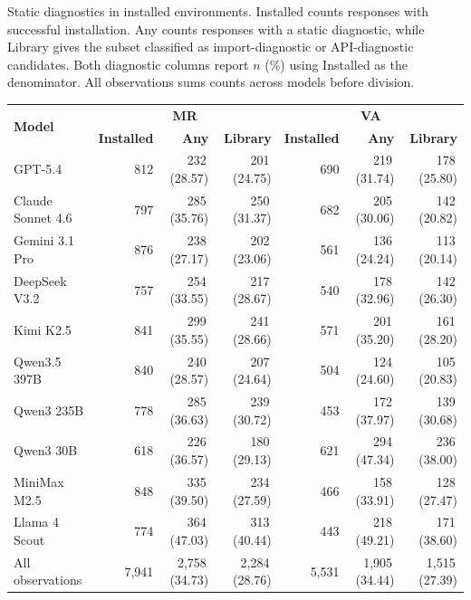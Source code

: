 \begin{tableorg}[!htbp]
\centering\small
\renewcommand{\tablecaptionfont}{\fontsize{9}{11}\selectfont}
\caption{Static diagnostics in installed \myso environments.
Installed counts responses with successful installation.
Any counts responses with a static diagnostic, while Library gives the subset classified as import-diagnostic or API-diagnostic candidates.
Both diagnostic columns report $n$ (\%) using Installed as the denominator.
All observations sums counts across models before division.}
\label{tab:rq3_installed_diagnostics}
\setlength{\tabcolsep}{1pt}
\renewcommand{\arraystretch}{1.12}
\begin{tabular}{@{}lrrr@{\hspace{4pt}}rrr@{}}
\toprule
\multirow{2}{*}{\textbf{Model}} & \multicolumn{3}{c}{\textbf{MR}} & \multicolumn{3}{c}{\textbf{VA}} \\
\cmidrule(lr){2-4}\cmidrule(lr){5-7}
& \textbf{Installed} & \textbf{Any} & \textbf{Library} & \textbf{Installed} & \textbf{Any} & \textbf{Library} \\
\midrule
GPT-5.4 & 812 & 232\,(28.57) & 201\,(24.75) & 690 & 219\,(31.74) & 178\,(25.80) \\
Claude Sonnet 4.6 & 797 & 285\,(35.76) & 250\,(31.37) & 682 & 205\,(30.06) & 142\,(20.82) \\
Gemini 3.1 Pro & 876 & 238\,(27.17) & 202\,(23.06) & 561 & 136\,(24.24) & 113\,(20.14) \\
DeepSeek V3.2 & 757 & 254\,(33.55) & 217\,(28.67) & 540 & 178\,(32.96) & 142\,(26.30) \\
Kimi K2.5 & 841 & 299\,(35.55) & 241\,(28.66) & 571 & 201\,(35.20) & 161\,(28.20) \\
Qwen3.5 397B & 840 & 240\,(28.57) & 207\,(24.64) & 504 & 124\,(24.60) & 105\,(20.83) \\
Qwen3 235B & 778 & 285\,(36.63) & 239\,(30.72) & 453 & 172\,(37.97) & 139\,(30.68) \\
Qwen3 30B & 618 & 226\,(36.57) & 180\,(29.13) & 621 & 294\,(47.34) & 236\,(38.00) \\
MiniMax M2.5 & 848 & 335\,(39.50) & 234\,(27.59) & 466 & 158\,(33.91) & 128\,(27.47) \\
Llama 4 Scout & 774 & 364\,(47.03) & 313\,(40.44) & 443 & 218\,(49.21) & 171\,(38.60) \\
\midrule
All observations & 7,941 & 2,758\,(34.73) & 2,284\,(28.76) & 5,531 & 1,905\,(34.44) & 1,515\,(27.39) \\
\bottomrule
\end{tabular}
\end{tableorg}
